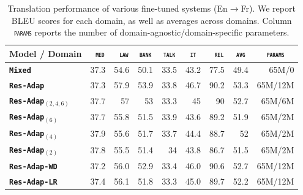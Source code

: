 \documentclass[11pt,a4paper]{article}
\newcommand{\fyDone}[1]{\done[FY]\Todo[FY:]{\textcolor{orange}{#1}}}
\newcommand{\domain}[1]{\texttt{\textsc{#1}}}
\newcommand{\system}[1]{\texttt{\textbf{#1}}}
\begin{document}
\begin{table}[htbp]
  \centering
  \begin{tabular}{|p{3cm}|*{8}{r|}} \hline
    Model / Domain & \multicolumn{1}{c|}{\domain{ med}} & \multicolumn{1}{c|}{\domain{ law}} & \multicolumn{1}{c|}{\domain{bank}} & \multicolumn{1}{c|}{\domain{talk}} & \multicolumn{1}{c|}{\domain{ it }} & \multicolumn{1}{c|}{\domain{ rel}} & \multicolumn{1}{c|}{\domain{avg}} & \multicolumn{1}{c|}{\domain{params}} \\ \hline 
    \system{Mixed}  & 37.3 & 54.6 & 50.1 & 33.5 & 43.2 & 77.5  & 49.4 & 65M/0 \\
    \system{Res-Adap}     & 37.3 & 57.9 & 53.9 & 33.8 & 46.7 & 90.2 & 53.3 & 65M/12M\\ \hline
    \system{Res-Adap$_{(2,4,6)}$}     & 37.7 & 57 & 53 & 33.3 & 45 & 90 & 52.7 & 65M/6M\\
    \system{Res-Adap$_{(6)}$}     & 37.7 & 55.8 & 51.5 & 33.9 & 43.6 & 89.2 & 51.9 & 65M/2M \\
    \system{Res-Adap$_{(4)}$}     & 37.9 & 55.6 & 51.7 & 33.7 & 44.4 & 88.7 & 52 & 65M/2M\\
    \system{Res-Adap$_{(2)}$}     & 37.8 & 55.5 & 51.4 & 34 & 43.8 & 86.7 & 51.5 & 65M/2M\\ \hline
    \system{Res-Adap-WD}     & 37.2 & 56.0 & 52.9 & 33.4 & 46.0 & 90.6 & 52.7 & 65M/12M \\
    \system{Res-Adap-LR}      & 37.4 & 56.1 & 51.8 & 33.3 & 45.0 & 89.7 & 52.2 & 65M/12M \\  
     \hline
  \end{tabular}
  \caption{Translation performance of various fine-tuned systems (En$\rightarrow$Fr). We report BLEU scores for each domain, as well as averages across domains. Column \domain{params} reports the number of domain-agnostic/domain-specific parameters.\label{tab:performance-en-fr-pos-reg}} \fyDone{Boldface ?}
\end{table}
\end{document}
